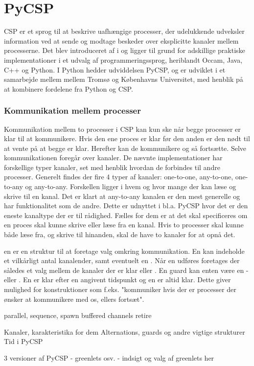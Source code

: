 \chapter{PyCSP}
CSP er et sprog til at beskrive uafhængige processer, der udelukkende udveksler information ved at sende og modtage beskeder over eksplicitte kanaler mellem processerne. Det blev introduceret af \citeauthor{hoare-csp} i \cite{hoare-csp} og ligger til grund for adskillige praktiske implementationer i et udvalg af programmeringssprog, heriblandt Occam, Java, C++ og Python. I Python hedder udviddelsen PyCSP\cite{pycsp}, og er udviklet i et samarbejde mellem mellem Tromsø og Københavns Universitet, med henblik på at kombinere fordelene fra Python og CSP. 

\subsection{Kommunikation mellem processer}
Kommunikation mellem to processer i CSP kan kun ske når begge processer er klar til at kommunikere. Hvis den ene proces er klar før den anden er den nødt til at vente på at begge er klar. Herefter kan de kommunikere og så fortsætte. Selve kommunikationen foregår over kanaler. De nævnte implementationer har forskellige typer kanaler, set med henblik hvordan de forbindes til andre processer. Generelt findes der fire 4 typer af kanaler: one-to-one, any-to-one, one-to-any og any-to-any. Forskellen ligger i hvem og hvor mange der kan læse og skrive til en kanal. Det er klart at any-to-any kanalen er den mest generelle og har funktionalitet som de andre. Dette er udnyttet i bl.a. PyCSP hvor det er den eneste kanaltype der er til rådighed. Fælles for dem er at det skal specificeres om en proces skal kunne skrive eller læse fra en kanal. Hvis to processer skal kunne både læse fra, og skrive til hinanden, skal de have to kanaler for at opnå det. 

en  er en struktur til at foretage valg omkring kommunikation. En  kan indeholde et vilkårligt antal kanalender, samt eventuelt en . Når en  udføres foretages der således et valg mellem de kanaler der er klar eller . En guard kan enten være en - eller . En  er klar efter en angivent tidspunkt og en  er altid klar. Dette giver mulighed for konstruktioner som f.eks. "kommuniker hvis der er processer der ønsker at kommunikere med os, ellers fortsæt". 

parallel, sequence, spawn
buffered channels
retire




Kanaler, karakteristika for dem
Alternations, guards og andre vigtige strukturer
Tid i PyCSP

3 versioner af PyCSP - greenlets osv.
 - indsigt og valg af greenlets her






